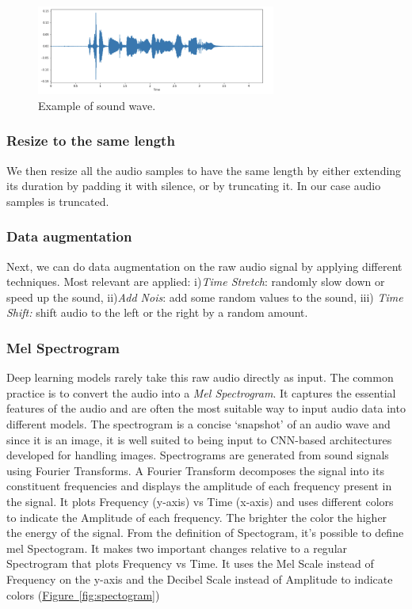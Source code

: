 \documentclass[english, LaM, oneside]{sapthesis}%
\begin{document}
\begin{figure}[h]
            \centering
            \includegraphics[width=0.70\textwidth]{audio_wave.png}
            \caption{Example of sound wave.}
            \label{fig:wave}
\end{figure}
\subsubsection{Resize to the same length}
We then resize all the audio samples to have the same length by either extending its duration by padding it with silence, or by truncating it. In our case audio samples is truncated.

\subsubsection{Data augmentation}
Next, we can do data augmentation on the raw audio signal by applying different techniques. Most relevant are applied: i)\textit{Time Stretch}: randomly slow down or speed up the sound, ii)\textit{Add Nois}: add some random values to the sound, iii) \textit{Time Shift: }shift audio to the left or the right by a random amount.

\subsubsection{Mel Spectrogram}
Deep learning models rarely take this raw audio directly as input. The common practice is to convert the audio into a \textit{Mel Spectrogram}. It captures the essential features of the audio and are often the most suitable way to input audio data into different models.
The spectrogram is a concise ‘snapshot’ of an audio wave and since it is an image, it is well suited to being input to CNN-based architectures developed for handling images. Spectrograms are generated from sound signals using Fourier Transforms. A Fourier Transform decomposes the signal into its constituent frequencies and displays the amplitude of each frequency present in the signal. It plots Frequency (y-axis) vs Time (x-axis) and uses different colors to indicate the Amplitude of each frequency. The brighter the color the higher the energy of the signal. 
\newline \newline
From the definition of Spectogram, it's possible to define mel Spectogram. It makes two important changes relative to a regular Spectrogram that plots Frequency vs Time. It uses the Mel Scale instead of Frequency on the y-axis and the Decibel Scale instead of Amplitude to indicate colors (\hyperref[fig:spectogram]{Figure~\ref*{fig:spectogram}})
\end{document}
